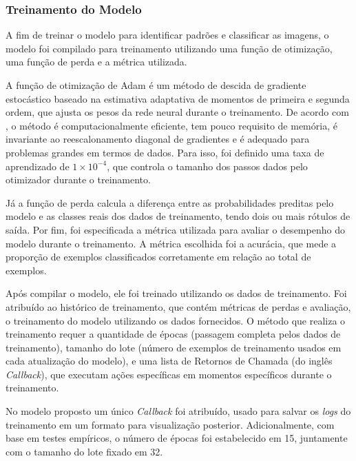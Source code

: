 
\subsubsection{\esp Treinamento do Modelo} \label{treinamento}

A fim de treinar o modelo para identificar padrões e classificar as imagens, o modelo foi compilado para treinamento utilizando uma função de otimização, uma função de perda e a métrica utilizada. 

A função de otimização de Adam é um método de descida de gradiente estocástico baseado na estimativa adaptativa de momentos de primeira e segunda ordem, que ajusta os pesos da rede neural durante o treinamento. De acordo com , o método é computacionalmente eficiente, tem pouco requisito de memória, é invariante ao reescalonamento diagonal de gradientes e é adequado para problemas grandes em termos de dados. Para isso, foi definido uma taxa de aprendizado de \ensuremath{1 \times 10^{-4}}, que controla o tamanho dos passos dados pelo otimizador durante o treinamento.

Já a função de perda calcula a diferença entre as probabilidades preditas pelo modelo e as classes reais dos dados de treinamento, tendo dois ou mais rótulos de saída. Por fim, foi especificada a métrica utilizada para avaliar o desempenho do modelo durante o treinamento. A métrica escolhida foi a acurácia, que mede a proporção de exemplos classificados corretamente em relação ao total de exemplos. 

Após compilar o modelo, ele foi treinado utilizando os dados de treinamento. Foi atribuído ao histórico de treinamento, que contém métricas de perdas e avaliação, o treinamento do modelo utilizando os dados fornecidos. O método que realiza o treinamento requer a quantidade de épocas (passagem completa pelos dados de treinamento), tamanho do lote (número de exemplos de treinamento usados em cada atualização do modelo), e uma lista de Retornos de Chamada (do inglês \textit{Callback}), que executam ações específicas em momentos específicos durante o treinamento. 

No modelo proposto um único \textit{Callback} foi atribuído, usado para salvar os \textit{logs} do treinamento em um formato para visualização posterior. Adicionalmente, com base em testes empíricos, o número de épocas foi estabelecido em 15, juntamente com o tamanho do lote fixado em 32.


